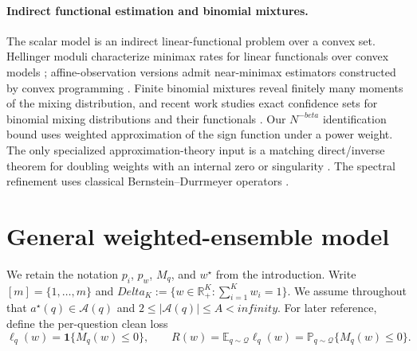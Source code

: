 \documentclass[11pt]{article}
\def\beta{beta}%
\def\infty{infinity}%
\def\Delta{Delta}%
\newcommand{\Pp}{\mathbb P}
\newcommand{\E}{\mathbb E}
\newcommand{\R}{\mathbb R}
\newcommand{\one}{\mathbf 1}
\newcommand{\calQ}{\mathcal Q}
\newcommand{\calA}{\mathcal A}
\begin{document}
\paragraph{Indirect functional estimation and binomial mixtures.}
The scalar model is an indirect linear-functional problem over a convex set.  Hellinger moduli characterize minimax rates for linear functionals over convex models \citep{DonohoLiuII}; affine-observation versions admit near-minimax estimators constructed by convex programming \citep{JuditskyNemirovski}.  Finite binomial mixtures reveal finitely many moments of the mixing distribution, and recent work studies exact confidence sets for binomial mixing distributions and their functionals \citep{BasuBinomial}.  Our $N^{-\beta}$ identification bound uses weighted approximation of the sign function under a power weight.  The only specialized approximation-theory input is a matching direct/inverse theorem for doubling weights with an internal zero or singularity \citep{Kopotun}.  The spectral refinement uses classical Bernstein--Durrmeyer operators \citep{DurrmeyerSpectral}.

\section{General weighted-ensemble model}
\label{sec:general-model}

We retain the notation $p_i$, $p_w$, $M_q$, and $w^\star$ from the introduction.  Write $[m]=\{1,\dots,m\}$ and $\Delta_K:=\{w\in\R_+^K:\sum_{i=1}^K w_i=1\}$.  We assume throughout that $a^\star(q)\in\calA(q)$ and $2\le |\calA(q)|\le A<\infty$.  For later reference, define the per-question clean loss
\begin{equation}
\label{eq:clean-loss-risk}
\ell_q(w)=\one\{M_q(w)\le0\},
\qquad
R(w)=\E_{q\sim\calQ}\ell_q(w)
=\Pp_{q\sim\calQ}\{M_q(w)\le0\}.
\end{equation}
\end{document}
